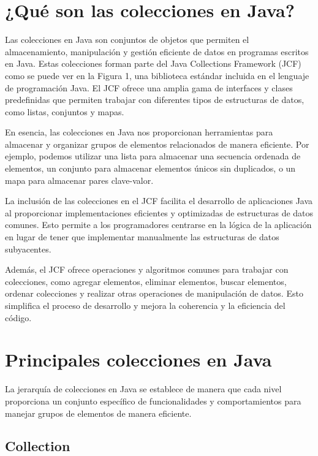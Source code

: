 \documentclass[a4paper,12pt]{article}
\begin{document}
\section{¿Qué son las colecciones en Java?}

Las colecciones en Java son conjuntos de objetos que permiten el almacenamiento, manipulación y gestión eficiente de datos en programas escritos en Java. Estas colecciones forman parte del Java Collections Framework (JCF) como se puede ver en la Figura 1, una biblioteca estándar incluida en el lenguaje de programación Java. El JCF ofrece una amplia gama de interfaces y clases predefinidas que permiten trabajar con diferentes tipos de estructuras de datos, como listas, conjuntos y mapas.

En esencia, las colecciones en Java nos proporcionan herramientas para almacenar y organizar grupos de elementos relacionados de manera eficiente. Por ejemplo, podemos utilizar una lista para almacenar una secuencia ordenada de elementos, un conjunto para almacenar elementos únicos sin duplicados, o un mapa para almacenar pares clave-valor.

La inclusión de las colecciones en el JCF facilita el desarrollo de aplicaciones Java al proporcionar implementaciones eficientes y optimizadas de estructuras de datos comunes. Esto permite a los programadores centrarse en la lógica de la aplicación en lugar de tener que implementar manualmente las estructuras de datos subyacentes.

Además, el JCF ofrece operaciones y algoritmos comunes para trabajar con colecciones, como agregar elementos, eliminar elementos, buscar elementos, ordenar colecciones y realizar otras operaciones de manipulación de datos. Esto simplifica el proceso de desarrollo y mejora la coherencia y la eficiencia del código.

\section{Principales colecciones en Java}

La jerarquía de colecciones en Java se establece de manera que cada nivel proporciona un conjunto específico de funcionalidades y comportamientos para manejar grupos de elementos de manera eficiente.

\subsection{Collection}
\end{document}
